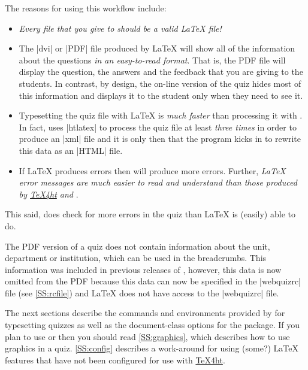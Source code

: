 \documentclass[svgnames]{article}
\newcommand\TeXfht{\href{https://www.ctan.org/tex4ht}{TeX4ht}\xspace}
\newcommand\webquizrc{\index{webquizrc}\BashCode|webquizrc|\xspace}
\begin{document}
  The reasons for using this workflow include: \begin{itemize} \item
    \textit{Every file that you give to \WebQuiz should be a valid
    \LaTeX{} file!}

    \item The \BashCode|dvi| or \BashCode|PDF| file produced by \LaTeX{}
    will show all of the information about the questions
    \textit{in an easy-to-read format}. That is, the PDF file will
    display the question, the answers and the feedback that you are
    giving to the students. In contrast, by design, the on-line version
    of the quiz hides most of this information and displays it to the
    student only when they need to see it.

    \item Typesetting the quiz file with \LaTeX{} is \textit{much
    faster} than processing it with \WebQuiz. In fact, \WebQuiz uses
    \BashCode|htlatex| to process the quiz file at least \textit{three times} in
    order to produce an \BashCode|xml| file and it is only then that the
    \WebQuiz program kicks in to rewrite this data as an \BashCode|HTML|
    file.

    \item If \LaTeX{} produces errors then \WebQuiz will produce more
    errors. Further, \textit{\LaTeX{} error messages are much easier to read and
    understand than those produced by \TeXfht and \WebQuiz}.
  \end{itemize}
  This said, \WebQuiz does check for more errors in the quiz than
  \LaTeX{} is (easily) able to do.

  The PDF version of a quiz does not contain information about
  the unit, department or institution, which can be used in the
  breadcrumbs. This information was included in previous releases of
  \WebQuiz, however, this data is now omitted from the PDF because this
  data can now be specified in the \webquizrc file (see
  \autoref{SS:rcfile}) and \LaTeX{} does not have access to the
  \webquizrc file.

  The next sections describe the commands and environments provided by
  \WebQuiz for typesetting quizzes as well as the document-class options
  for the package. If you plan to use  or
   then you should read \autoref{SS:graphics}, which
  describes how to use graphics in a \WebQuiz quiz.
  \autoref{SS:config} describes a work-around for using (some?) \LaTeX{}
  features that have not been configured for use with \TeXfht.
\end{document}
